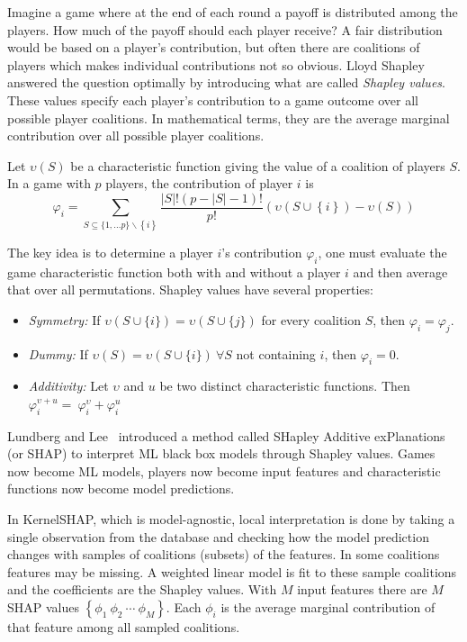 \documentclass[journal]{IEEEtran} %
\begin{document}
Imagine a game where at the end of each round a payoff is distributed among the players.  How much of the payoff should each player receive? A fair distribution would be based on a player's contribution, but often there are coalitions of players which makes individual contributions not so obvious. Lloyd Shapley~\cite{shapley} answered the question optimally by introducing what are called \emph{Shapley values}. These values specify each player's contribution to a game outcome over all possible player coalitions. In mathematical terms, they are the average marginal contribution over all possible player coalitions. 

Let $\upsilon(S)$ be a characteristic function giving the value of a coalition of players $S$. In a game with $p$ players, the contribution of player $i$ is
\begin{equation}
  \varphi_{i}  =  \sum_{S\subseteq \{1,\ldots p\}\text{} \backslash \left\{ i\right\}  \text{} } \frac{\left| S\right|  !\left( p-\left| S\right|  -1\right)  !}{p!} \left( \upsilon\left( S\cup \left\{ i\right\}  \right)  -\upsilon(S)\right)  
  \label{eqn1}
\end{equation}

The key idea is to determine a player $i$'s contribution $\varphi_i$, one must evaluate the game characteristic function both with and without a player $i$ and then average that over all permutations. Shapley values have several properties:

\begin{itemize}
    \item \textit{Symmetry:} If $\upsilon(S\cup\{i\}) = \upsilon(S\cup\{j\})$ for every coalition $S$, then $\varphi_i=\varphi_j$.
    \item \textit{Dummy:} If $\upsilon(S)=\upsilon(S\cup\{i\})\ \forall S$ not containing $i$, then $\varphi_i=0$.
    \item \textit{Additivity:} Let $\upsilon$ and $u$ be two distinct characteristic functions. Then $\varphi^{\upsilon +u}_{i} =\  \varphi^{\upsilon }_{i} +\varphi^{u}_{i}$ 
\end{itemize}
\vspace{1ex}

Lundberg and Lee~\cite{lund} introduced a method called SHapley Additive exPlanations (or SHAP) to interpret ML black box models through Shapley values. Games now become ML models, players now become input features and characteristic functions now become model predictions. 

In KernelSHAP, which is model-agnostic, local interpretation is done by taking a single observation from the database and checking how the model prediction changes with samples of coalitions (subsets) of the features. In some coalitions features may be missing. A weighted linear model is fit to these sample coalitions and the coefficients are the Shapley values.
With $M$ input features there are $M$ SHAP values 
$\left\{ \phi_{1} \  \phi_{2} \  \cdots \  \phi_{M} \right\}$. Each $\phi_i$ is the average marginal contribution of that feature among all sampled coalitions. 
\end{document}
